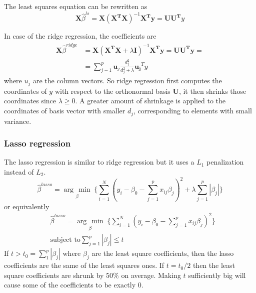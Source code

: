 \documentclass[12pt, letterpaper]{article}
\theoremstyle{definition}
\newcommand{\argmin}[1]{\underset{#1}{\operatorname{arg}\,\operatorname{min}}\;}
\begin{document}
The least squares equation can be rewritten as 
\begin{equation}
\mathbf{X}\hat{\beta}^{ls}  = \mathbf{X\left( X^TX\right)}^{-1}\mathbf{X^Ty} = \mathbf{UU^T}y
\end{equation}

In case of the ridge regression, the coefficients are
\begin{equation}
\begin{aligned}
\mathbf{X}\hat{\beta}^{ridge}  &= \mathbf{X}\left( \mathbf{X^TX} +\lambda \mathbf{I} \right)^{-1}\mathbf{X^Ty} = \mathbf{UU^Ty} =\\
&= \sum_{j-1}^p \mathbf{u}_j \frac{d_j^2}{d_j^2+\lambda} \mathbf{u_j}^Ty
\end{aligned}
\end{equation}
where $u_j$ are the column vectors. So ridge regression first computes the coordinates of $y$ with respect to the orthonormal basis $\mathbf{U}$, it then shrinks those coordinates since $\lambda\ge0$. A greater amount of shrinkage is applied to the coordinates of basis vector with smaller $d_j$, corresponding to elements with small variance.

\subsubsection{Lasso regression}
The lasso regression is similar to ridge regression but it uses a $L_1$ penalization instead of $L_2$.
\begin{equation}
\label{blasso}
\hat{\beta}^{lasso} = \argmin{\beta} \Bigg\lbrace \sum_{i=1}^N \left( y_i -  \beta_0 - \sum_{j=1}^p x_{ij} \beta_j\right)^2+ \lambda \sum_{j=1}^p |\beta_j| \Bigg\rbrace
\end{equation}
or equivalently
\begin{equation}
\begin{aligned}
&\hat{\beta}^{lasso} = \argmin{\beta} \Bigg\lbrace \sum_{i=1}^N \left( y_i -  \beta_0 - \sum_{j=1}^p x_{ij} \beta_j\right)^2 \Bigg\rbrace\\
&\text{subject to} \sum_{j=1}^p |\beta_j| \le t
\end{aligned}
\end{equation}
If $t>t_0= \sum_1^p |\beta_j|$ where $\beta_j$ are the least square coefficients, then the lasso coefficients are the same of the least squares ones. If $t=t_0/2$ then the least square coefficients are shrunk by $50\%$ on average. Making $t$ sufficiently big will cause some of the coefficients to be exactly $0$.
\end{document}
